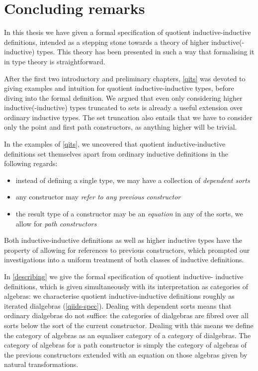 \chapter{Concluding remarks}
\label{conclusion}

In this thesis we have given a formal specification of quotient
inductive-inductive definitions, intended as a stepping stone towards
a theory of higher inductive(-inductive) types. This theory has been
presented in such a way that formalising it in type theory is
straightforward.

After the first two introductory and preliminary chapters, \cref{qits}
was devoted to giving examples and intuition for quotient
inductive-inductive types, before diving into the formal
definition. We argued that even only considering higher
inductive(-inductive) types truncated to sets is already a useful
extension over ordinary inductive types. The set truncation also
entails that we have to consider only the point and first path
constructors, as anything higher will be trivial. 

In the examples of \cref{qits}, we uncovered that quotient
inductive-inductive definitions set themselves apart from ordinary
inductive definitions in the following regards:
%
\begin{itemize}
\item instead of defining a single type, we may have a collection of
  \emph{dependent sorts}
\item any constructor may \emph{refer to any previous constructor}
\item the result type of a constructor may be an \emph{equation} in
  any of the sorts, \ie we allow for \emph{path constructors}
\end{itemize}
%
Both inductive-inductive definitions as well as higher inductive types
have the property of allowing for references to previous constructors,
which prompted our investigations into a uniform treatment of both
classes of inductive definitions.

In \cref{describing} we give the formal specification of quotient
inductive- inductive definitions, which is given simultaneously with
its interpretation as categories of algebras: we characterise quotient
inductive-inductive definitions roughly as iterated dialgebras
(\cref{qiids-spec}). Dealing with dependent sorts means that ordinary
dialgebras do not suffice: the categories of dialgebras are fibred
over all sorts below the sort of the current constructor. Dealing with
this means we define the category of algebras as an equaliser category
of a category of dialgebras. The category of algebras for a path
constructor is simply the category of algebras of the previous
constructors extended with an equation on those algebras given by
natural transformations.

